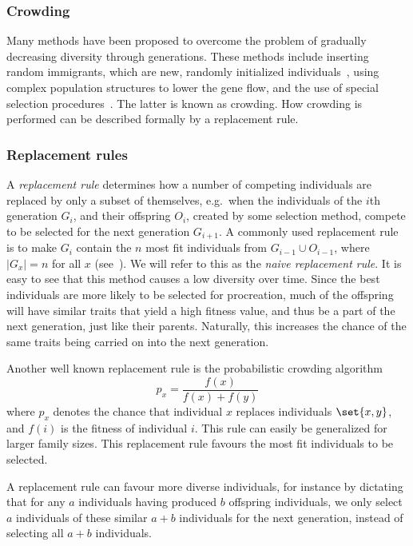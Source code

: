 \subsubsection{Crowding}
Many methods have been proposed to overcome the problem of gradually decreasing diversity through generations. These methods include inserting random immigrants, which are new, randomly initialized individuals~\cite{Cobb93geneticalgorithms}, using complex population structures to lower the gene flow, and the use of special selection procedures~\cite{ursem2002diversity}. The latter is known as crowding.  How crowding is performed can be described formally by a replacement rule.

\subsubsection{Replacement rules}
A \emph{replacement rule} determines how a number of competing individuals are replaced by only a subset of themselves, e.g.\ when the individuals of the $i$th generation $G_i$, and their offspring $O_i$, created by some selection method, compete to be selected for the next generation $G_{i+1}$. A commonly used replacement rule is to make $G_i$ contain the $n$ most fit individuals from $G_{i-1} \cup O_{i-1}$, where $\mid G_x\mid = n$ for all $x$ (see~\cite{masterThesisGANN}). We will refer to this as the \emph{naive replacement rule}. It is easy to see that this method causes a low diversity over time. Since the best individuals are more likely to be selected for procreation, much of the offspring will have similar traits that yield a high fitness value, and thus be a part of the next generation, just like their parents. Naturally, this increases the chance of the same traits being carried on into the next generation.

Another well known replacement rule is the probabilistic crowding algorithm~\cite{Mengshoel_and_Goldberg:1999}
%
\[
  p_x = \frac{f\left(x\right)}{f\left(x\right)+f\left(y\right)}
\]
%
where $p_x$ denotes the chance that individual $x$ replaces individuals $\set{x, y}$, and $f(i)$ is the fitness of individual $i$. This rule can easily be generalized for larger family sizes. This replacement rule favours the most fit individuals to be selected.

A replacement rule can favour more diverse individuals, for instance by dictating that for any $a$ individuals having produced $b$ offspring individuals, we only select $a$ individuals of these similar $a + b$ individuals for the next generation, instead of selecting all $a + b$ individuals.

